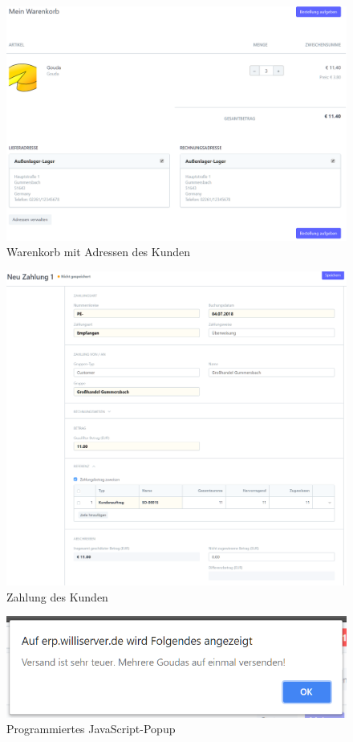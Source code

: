 \begin{figure}
  \centering
  \includegraphics[width=\textwidth]{Bilder/Bestellung.PNG}
  \caption{Warenkorb mit Adressen des Kunden}
  \label{fig:webWarenkorb}
\end{figure}
\begin{figure}
  \centering
  \includegraphics[width=\textwidth]{Bilder/Zahlung_Kunde.PNG}
  \caption{Zahlung des Kunden}
  \label{fig:zahKunde}
\end{figure}
\begin{figure}
  \centering
  \includegraphics[width=\textwidth]{Bilder/JS_Popup.PNG}
  \caption{Programmiertes JavaScript-Popup}
  \label{fig:jsPopup}
\end{figure}
